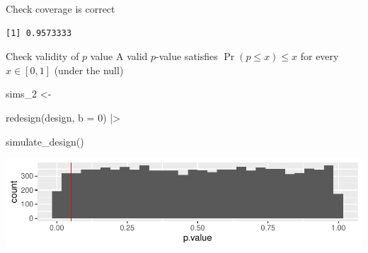 \documentclass[
  11pt,
  ignorenonframetext,
]{beamer}
\newenvironment{Shaded}{\begin{snugshade}}{\end{snugshade}}
\newcommand{\AttributeTok}[1]{\textcolor[rgb]{0.40,0.45,0.13}{#1}}
\newcommand{\DecValTok}[1]{\textcolor[rgb]{0.68,0.00,0.00}{#1}}
\newcommand{\FunctionTok}[1]{\textcolor[rgb]{0.28,0.35,0.67}{#1}}
\newcommand{\NormalTok}[1]{\textcolor[rgb]{0.00,0.23,0.31}{#1}}
\newcommand{\OtherTok}[1]{\textcolor[rgb]{0.00,0.23,0.31}{#1}}
\newcommand{\SpecialCharTok}[1]{\textcolor[rgb]{0.37,0.37,0.37}{#1}}
\begin{document}
\begin{frame}[fragile]{Check coverage is correct}
\protect\hypertarget{check-coverage-is-correct}{}
\begin{Shaded}
\end{Shaded}

\begin{verbatim}
[1] 0.9573333
\end{verbatim}
\end{frame}

\begin{frame}[fragile]{Check validity of \(p\) value}
\protect\hypertarget{check-validity-of-p-value}{}
A valid \(p\)-value satisfies \(\Pr(p≤x)≤x\) for every \(x \in[0,1]\)
(under the null)

\begin{Shaded}
\begin{Highlighting}[]
\NormalTok{sims\_2 }\OtherTok{\textless{}{-}} 
  
  \FunctionTok{redesign}\NormalTok{(design, }\AttributeTok{b =} \DecValTok{0}\NormalTok{) }\SpecialCharTok{|\textgreater{}}
  
  \FunctionTok{simulate\_design}\NormalTok{() }
\end{Highlighting}
\end{Shaded}

\includegraphics{0_lectures_files/figure-beamer/unnamed-chunk-447-1.pdf}
\end{frame}
\end{document}
